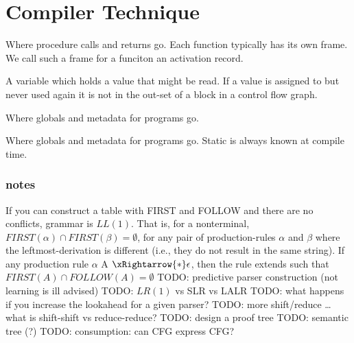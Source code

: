 \section{Compiler Technique}
\begin{definition}[LL]\label{def:LL}
\end{definition}

\begin{definition}\label{def:staticmemory}
    Where procedure calls and returns go. Each function typically has
    its own frame. We call such a frame for a funciton an activation record.
\end{definition}

\begin{definition}\label{def:livevariable}
    A variable which holds a value that might be read. If a value is assigned
    to but never used again it is not in the out-set of a block in a control
    flow graph.
\end{definition}

\begin{definition}\label{def:staticmemory}
    Where globals and metadata for programs go.
\end{definition}

\begin{definition}\label{def:staticmemory}
    Where globals and metadata for programs go. Static is always known at
    compile time.
\end{definition}

\subsubsection{notes}
If you can construct a table with FIRST and FOLLOW and there are no
conflicts, grammar is $LL(1)$. That is, for a nonterminal, $FIRST(\alpha) \cap FIRST(\beta) = \emptyset$, for any pair of production-rules $\alpha$ and $\beta$ where the leftmost-derivation is different (i.e., they do not result in the same string). If any production rule $\alpha$ A $\xRightarrow{*} \epsilon$, then the rule extends such that $FIRST(A) \cap FOLLOW(A) = \emptyset$
TODO: predictive parser construction (not learning is ill advised)
TODO: $LR(1)$ vs SLR vs LALR
TODO: what happens if you increase the lookahead for a given parser?
TODO: more shift/reduce \dots what is shift-shift vs reduce-reduce?
TODO: design a proof tree
TODO: semantic tree (?)
TODO: consumption: can CFG express CFG? 

